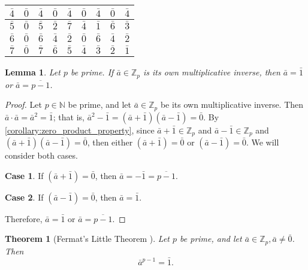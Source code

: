 \documentclass[12pt, titlepage]{amsart}
\newcommand\Z{{\mathbb Z}}
\newcommand\N{{\mathbb N}}
\newtheorem{theorem}{Theorem}[subsection]
\newtheorem{lemma}{Lemma}[subsection]
\theoremstyle{definition}
\begin{document}
\begin{table}[h!]
\begin{minipage}{0.48\textwidth}
\begin{tabular}{|c|c|c|c|c|c|c|c|c|}
			$\bar{4}$	& $\bar{0}$ & $\bar{4}$ & $\bar{0}$ & $\bar{4}$ & $\bar{0}$ & $\bar{4}$ & $\bar{0}$ & $\bar{4}$ \\ \hline
			$\bar{5}$	& $\bar{0}$ & $\bar{5}$ & $\bar{2}$ & $\bar{7}$ & $\bar{4}$ & $\bar{1}$ & $\bar{6}$ & $\bar{3}$ \\ \hline
			$\bar{6}$	& $\bar{0}$ & $\bar{6}$ & $\bar{4}$ & $\bar{2}$ & $\bar{0}$ & $\bar{6}$ & $\bar{4}$ & $\bar{2}$ \\ \hline
			$\bar{7}$	& $\bar{0}$ & $\bar{7}$ & $\bar{6}$ & $\bar{5}$ & $\bar{4}$ & $\bar{3}$ & $\bar{2}$ & $\bar{1}$ \\ \hline
			\end{tabular}
		\end{minipage}
	\end{table}	
	
	\begin{lemma}\label{lemma:1_and_p-1_own_inverses}
		Let $p$ be prime. If $\bar{a} \in \Z_p$ is its own multiplicative inverse, then $\bar{a} = \bar{1}$ or $\bar{a} = \overline{p-1}$.
	\end{lemma}
	
	\begin{proof}
		Let $p \in \N$ be prime, and let $\bar{a} \in \Z_p$ be its own multiplicative inverse.
		Then $\bar{a} \cdot \bar{a} = \bar{a}^2 = \bar{1}$; that is, $\bar{a}^2 - \bar{1} = (\bar{a} + \bar{1})(\bar{a} - \bar{1}) = \bar{0}$. 
		By \cref{corollary:zero_product_property}, since $\bar{a} + \bar{1} \in \Z_p$ and $\bar{a} - \bar{1} \in \Z_p$ and $(\bar{a} + \bar{1})(\bar{a} - \bar{1}) = \bar{0}$, then either $(\bar{a} + \bar{1}) = \bar{0}$ or $(\bar{a} - \bar{1}) = \bar{0}$. 
		We will consider both cases.
		
		\textbf{Case 1}. If $(\bar{a} + \bar{1}) = \bar{0}$, then $\bar{a} = -\bar{1} = \overline{p-1}$.
		
		\textbf{Case 2}. If $(\bar{a} - \bar{1}) = \bar{0}$, then $\bar{a} = \bar{1}$.
		
		\noindent Therefore, $\bar{a} = \bar{1}$ or $\bar{a} = \overline{p-1}$.
	\end{proof}
	
	
	\begin{theorem}[Fermat's Little Theorem \cite{pommersheim}]\label{theorem:fermats_little_theorem}
		Let $p$ be prime, and let $\bar{a} \in \Z_p, \bar{a} \neq \bar{0}$. Then $$ \bar{a}^{p-1} = \bar{1}.$$
	\end{theorem}
	
\end{document}
